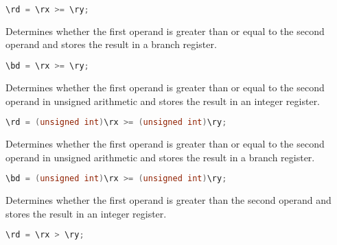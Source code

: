 \begin{lstlisting}[numbers=none, basicstyle=\ttfamily\footnotesize, language=C++]
\rd = \rx >= \ry;
\end{lstlisting}

Determines whether the first operand is greater than or equal to the second
operand and stores the result in a branch register.

\begin{lstlisting}[numbers=none, basicstyle=\ttfamily\footnotesize, language=C++]
\bd = \rx >= \ry;
\end{lstlisting}

Determines whether the first operand is greater than or equal to the second
operand in unsigned arithmetic and stores the result in an integer register.

\begin{lstlisting}[numbers=none, basicstyle=\ttfamily\footnotesize, language=C++]
\rd = (unsigned int)\rx >= (unsigned int)\ry;
\end{lstlisting}

Determines whether the first operand is greater than or equal to the second
operand in unsigned arithmetic and stores the result in a branch register.

\begin{lstlisting}[numbers=none, basicstyle=\ttfamily\footnotesize, language=C++]
\bd = (unsigned int)\rx >= (unsigned int)\ry;
\end{lstlisting}

Determines whether the first operand is greater than the second operand and
stores the result in an integer register.

\begin{lstlisting}[numbers=none, basicstyle=\ttfamily\footnotesize, language=C++]
\rd = \rx > \ry;
\end{lstlisting}

